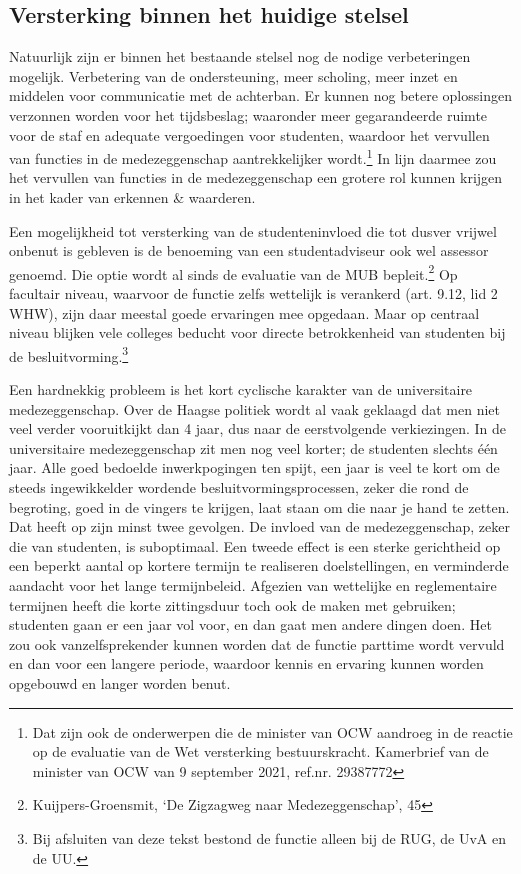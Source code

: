 \documentclass[smallauthor, chapterhaspagenum, nochapterinheader, pagenuminheader,  bigchapnum,medium2, tocpages,  garamond, titleinheader]{jote-book}
\begin{document}
	\subsection{Versterking binnen het huidige stelsel }



	Natuurlijk zijn er binnen het bestaande stelsel nog de nodige verbeteringen mogelijk. Verbetering van de ondersteuning, meer scholing, meer inzet en middelen voor communicatie met de achterban. Er kunnen nog betere oplossingen verzonnen worden voor het tijdsbeslag; waaronder meer gegarandeerde ruimte voor de staf en adequate vergoedingen voor studenten, waardoor het vervullen van functies in de medezeggenschap aantrekkelijker wordt.\footnote{Dat zijn ook de onderwerpen die de minister van OCW aandroeg in de reactie op de evaluatie van de Wet versterking bestuurskracht. Kamerbrief van de minister van OCW van 9 september 2021, ref.nr. 29387772} In lijn daarmee zou het vervullen van functies in de medezeggenschap een grotere rol kunnen krijgen in het kader van erkennen \& waarderen.



	Een mogelijkheid tot versterking van de studenteninvloed die tot dusver vrijwel onbenut is gebleven is de benoeming van een studentadviseur ook wel assessor genoemd. Die optie wordt al sinds de evaluatie van de MUB bepleit.\footnote{Kuijpers-Groensmit, ‘De Zigzagweg naar Medezeggenschap', 45} Op facultair niveau, waarvoor de functie zelfs wettelijk is verankerd (art. 9.12, lid 2 WHW), zijn daar meestal goede ervaringen mee opgedaan. Maar op centraal niveau blijken vele colleges beducht voor directe betrokkenheid van studenten bij de besluitvorming.\footnote{Bij afsluiten van deze tekst bestond de functie alleen bij de RUG, de UvA en de UU.}



	Een hardnekkig probleem is het kort cyclische karakter van de universitaire medezeggenschap. Over de Haagse politiek wordt al vaak geklaagd dat men niet veel verder vooruitkijkt dan 4 jaar, dus naar de eerstvolgende verkiezingen. In de universitaire medezeggenschap zit men nog veel korter; de studenten slechts één jaar. Alle goed bedoelde inwerkpogingen ten spijt, een jaar is veel te kort om de steeds ingewikkelder wordende besluitvormingsprocessen, zeker die rond de begroting, goed in de vingers te krijgen, laat staan om die naar je hand te zetten. Dat heeft op zijn minst twee gevolgen. De invloed van de medezeggenschap, zeker die van studenten, is suboptimaal. Een tweede effect is een sterke gerichtheid op een beperkt aantal op kortere termijn te realiseren doelstellingen, en verminderde aandacht voor het lange termijnbeleid. Afgezien van wettelijke en reglementaire termijnen heeft die korte zittingsduur toch ook de maken met gebruiken; studenten gaan er een jaar vol voor, en dan gaat men andere dingen doen. Het zou ook vanzelfsprekender kunnen worden dat de functie parttime wordt vervuld en dan voor een langere periode, waardoor kennis en ervaring kunnen worden opgebouwd en langer worden benut.
\end{document}
